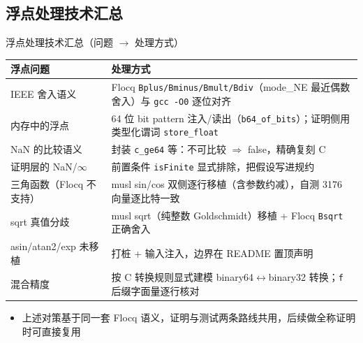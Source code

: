 \documentclass[UTF8,aspectratio=169]{ctexbeamer}
\begin{document}
\subsection{浮点处理技术汇总}
\begin{frame}{浮点处理技术汇总（问题 $\to$ 处理方式）}
  \centering\footnotesize
  \begin{tabular}{@{}p{4.6cm}p{7.6cm}@{}}
    \toprule
    浮点问题 & 处理方式 \\
    \midrule
    IEEE 舍入语义 & Flocq \texttt{Bplus/Bminus/Bmult/Bdiv}（mode\_NE 最近偶数舍入）与 \texttt{gcc -O0} 逐位对齐 \\
    内存中的浮点 & 64 位 bit pattern 注入/读出（\texttt{b64\_of\_bits}）；证明侧用类型化谓词 \texttt{store\_float} \\
    NaN 的比较语义 & 封装 \texttt{c\_ge64} 等：不可比较 $\Rightarrow$ false，精确复刻 C \\
    证明层的 NaN/$\infty$ & 前置条件 \texttt{isFinite} 显式排除，把假设写进规约 \\
    三角函数（Flocq 不支持） & musl sin/cos 双侧逐行移植（含参数约减），自测 3176 向量逐比特一致 \\
    sqrt 真值分歧 & musl sqrt（纯整数 Goldschmidt）移植 + Flocq \texttt{Bsqrt} 正确舍入 \\
    asin/atan2/exp 未移植 & 打桩 + 输入注入，边界在 README 置顶声明 \\
    混合精度 & 按 C 转换规则显式建模 binary64$\leftrightarrow$binary32 转换；\texttt{f} 后缀字面量逐行核对 \\
    \bottomrule
  \end{tabular}
  \vspace{0.6em}
  \begin{itemize}\small
    \item 上述对策基于同一套 Flocq 语义，证明与测试两条路线共用，后续做全称证明时可直接复用
  \end{itemize}
\end{frame}
\end{document}
